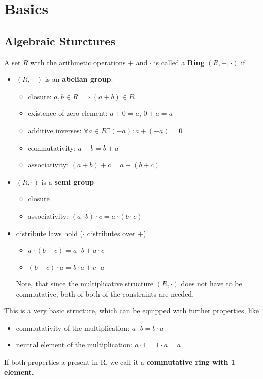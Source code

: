 
\section{Basics}

\subsection{Algebraic Sturctures}

\begin{definition}
	A set $R$ with the arithmetic operations $+$ and $\cdot$ is called a \textbf{Ring} $(R,+,\cdot)$ if
	\begin{itemize}
	\item $(R,+)$ is an \textbf{abelian group}:
		\begin{itemize}
		\item closure: $a,b \in R \implies (a+b)\in R $
		\item existence of zero element: $a+0=a$, $0+a=a$
		\item additive inverses: $\forall a \in R \exists (-a) : a + (-a) = 0$
		\item commutativity: $a+b=b+a$
		\item associativity: $(a+b)+c=a+(b+c)$
		\end{itemize}
	\item $(R, \cdot)$ is a \textbf{semi group}
		\begin{itemize}
			\item closure
			\item associativity: $(a \cdot b)\cdot c=a \cdot (b \cdot c)$
		\end{itemize}
	\item distribute laws hold ($\cdot$ distributes over $+$)
		\begin{itemize}
			\item $a \cdot (b+c) = a \cdot b + a \cdot c $
			\item $(b+c) \cdot a = b \cdot a + c \cdot a $
		\end{itemize}
		Note, that since the multiplicative structure $(R, \cdot)$ does not have to be commutative, both of both of the constraints are needed.
	\end{itemize}
\end{definition}

This is a very basic structure, which can be equipped with further properties, like
\begin{itemize}
	\item commutativity of the multiplication: $a \cdot b = b \cdot a$
	\item neutral element of the multiplication: $a \cdot 1 = 1 \cdot a = a$
\end{itemize}
If both properties a present in R, we call it a \textbf{commutative ring with 1 element}.

